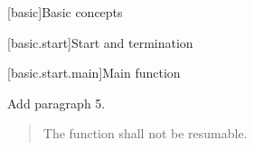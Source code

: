 
\setcounter{chapter}{2}
[basic]{Basic concepts}

\setcounter{section}{5}
[basic.start]{Start and termination}

[basic.start.main]{Main function}

Add paragraph 5.

\begin{quote}
	\setcounter{Paras}{4}
	\pnum
	The function  shall not be resumable.
\end{quote}

